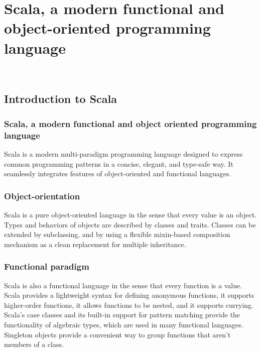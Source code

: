 
\chapter{Scala, a modern functional and object-oriented programming language}
\label{cap:scala-language}

\\

\section{Introduction to Scala}
\subsection{Scala, a modern functional and object oriented programming language}
Scala is a modern multi-paradigm programming language designed to express common programming patterns in a concise, elegant, and type-safe way.
It seamlessly integrates features of object-oriented and functional languages.

\subsection{Object-orientation}
Scala is a pure object-oriented language in the sense that every value is an object. Types and behaviors of objects are described by classes and traits.
Classes can be extended by subclassing, and by using a flexible \gls{mixin-based composition} mechanism as a clean replacement for multiple inheritance.

\subsection{Functional paradigm}
Scala is also a functional language in the sense that every function is a value.
Scala provides a lightweight syntax for defining anonymous functions, it supports higher-order functions, it allows functions to be nested, and it supports currying.
Scala's case classes and its built-in support for pattern matching provide the functionality of algebraic types, which are used in many functional languages.
Singleton objects provide a convenient way to group functions that aren't members of a class.


